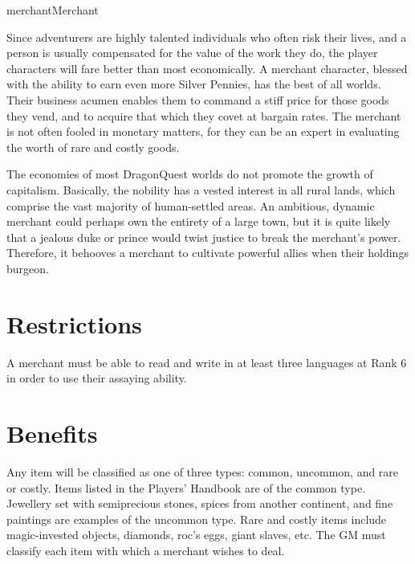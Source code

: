 \begin{Skill}[1.1]{merchant}{Merchant}

Since adventurers are highly talented individuals who often risk their
lives, and a person is usually compensated for the value of the work
they do, the player characters will fare better than most
economically.  A merchant character, blessed with the ability to earn
even more Silver Pennies, has the best of all worlds.  Their business
acumen enables them to command a stiff price for those goods they
vend, and to acquire that which they covet at bargain rates.  The
merchant is not often fooled in monetary matters, for they can be an
expert in evaluating the worth of rare and costly goods.

The economies of most DragonQuest worlds do not promote the growth of
capitalism.  Basically, the nobility has a vested interest in all
rural lands, which comprise the vast majority of human-settled areas.
An ambitious, dynamic merchant could perhaps own the entirety of a
large town, but it is quite likely that a jealous duke or prince would
twist justice to break the merchant’s power. Therefore, it behooves a
merchant to cultivate powerful allies when their holdings burgeon.

\section{Restrictions}

A merchant must be able to read and write in at least three languages
at Rank 6 in order to use their assaying ability.

\section{Benefits}


Any item will be classified as one of three types: common, uncommon,
and rare or costly.  Items listed in the Players’ Handbook are of the
common type. Jewellery set with semiprecious stones, spices from
another continent, and fine paintings are examples of the uncommon
type.  Rare and costly items include magic-invested objects, diamonds,
roc’s eggs, giant slaves, etc. The GM must classify each item with
which a merchant wishes to deal.



\end{Skill}
